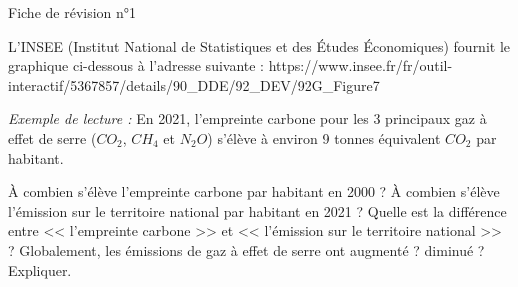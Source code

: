 \documentclass["../Cours.tex"]{subfiles}
\begin{document}
\begin{center}
    {\Huge Fiche de révision n°1}    
\end{center}


\thispagestyle{empty}

\color{black}

\begin{questions}

    L'INSEE (Institut National de Statistiques et des Études Économiques) fournit le graphique ci-dessous à l'adresse suivante :  {\tiny{https://www.insee.fr/fr/outil-interactif/5367857/details/90\_DDE/92\_DEV/92G\_Figure7}}

    \begin{center}
    \end{center}

    \textit{Exemple de lecture :} En 2021, l'empreinte carbone pour les 3 principaux gaz à effet de serre ($CO_2$, $CH_4$ et $N_2O$) s'élève à environ 9 tonnes équivalent $CO_2$ par habitant.

    \question À combien s'élève l'empreinte carbone par habitant en 2000 ?
    \question À combien s'élève l'émission sur le territoire national par habitant en 2021 ?
    \question Quelle est la différence entre << l'empreinte carbone >> et << l'émission sur le territoire national >> ?
    \question Globalement, les émissions de gaz à effet de serre ont augmenté ? diminué ? Expliquer.


\end{questions}
\end{document}

